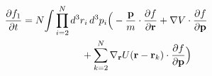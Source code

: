 \documentclass[preview]{standalone}
\begin{document}
\begin{align*}
\special{dvisvgm:raw <g id='unique000'>}\pdv{f_1}{t}&=N\!\int\prod_{i=2}^{N}d^3r_i\,d^3p_i\Big(-\frac{\va p}{m}\cdot\pdv{f}{\va r}+\nabla V\cdot\pdv{f}{\va p}\\&\hspace{6em}+\sum_{k=2}^{N}\nabla_{\va r}U(\va r-\va r_k)\cdot\pdv{f}{\va p}\Big)\special{dvisvgm:raw </g>}
\end{align*}
\end{document}
